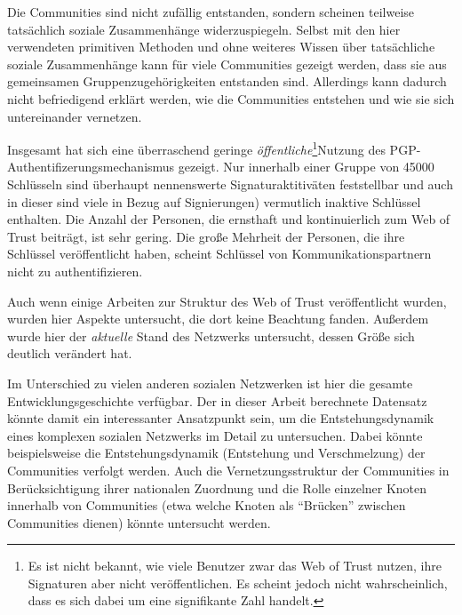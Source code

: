 Die Communities sind nicht zufällig entstanden, sondern scheinen
teilweise tatsächlich soziale Zusammenhänge
widerzuspiegeln. Selbst mit den hier verwendeten primitiven Methoden
und ohne weiteres Wissen über tatsächliche soziale Zusammenhänge
kann für viele Communities gezeigt werden, dass sie aus gemeinsamen
Gruppenzugehörigkeiten entstanden sind. Allerdings kann dadurch
nicht befriedigend erklärt werden, wie die Communities entstehen
und wie sie sich untereinander vernetzen.

Insgesamt hat sich eine überraschend geringe
\emph{öffentliche}\footnote{Es ist nicht bekannt, wie viele Benutzer
  zwar das Web of Trust nutzen, ihre Signaturen aber nicht
  veröffentlichen. Es scheint jedoch nicht wahrscheinlich, dass es
  sich dabei um eine signifikante Zahl handelt.}Nutzung des
PGP-Authentifizerungsmechanismus gezeigt. Nur innerhalb einer Gruppe
von 45000 Schlüsseln sind überhaupt nennenswerte
Signaturaktitiväten feststellbar und auch in dieser sind viele in
Bezug auf Signierungen) vermutlich inaktive Schlüssel enthalten. Die
Anzahl der Personen, die ernsthaft und kontinuierlich zum Web of Trust
beiträgt, ist sehr gering. Die große Mehrheit der Personen, die
ihre Schlüssel veröffentlicht haben, scheint Schlüssel von
Kommunikationspartnern nicht zu authentifizieren.

Auch wenn einige Arbeiten zur Struktur des Web of Trust
veröffentlicht wurden, wurden hier Aspekte untersucht, die dort
keine Beachtung fanden. Außerdem wurde hier der \emph{aktuelle} Stand
des Netzwerks untersucht, dessen Größe sich deutlich verändert
hat.

Im Unterschied zu vielen anderen sozialen Netzwerken ist hier die
gesamte Entwicklungsgeschichte verfügbar. Der in dieser Arbeit
berechnete Datensatz könnte damit ein interessanter Ansatzpunkt
sein, um die Entstehungsdynamik eines komplexen sozialen Netzwerks im
Detail zu untersuchen. Dabei könnte beispielsweise die
Entstehungsdynamik (Entstehung und Verschmelzung) der Communities
verfolgt werden. Auch die Vernetzungsstruktur der Communities in
Berücksichtigung ihrer nationalen Zuordnung und die Rolle einzelner
Knoten innerhalb von Communities (etwa welche Knoten als ``Brücken''
zwischen Communities dienen) könnte untersucht
werden.

